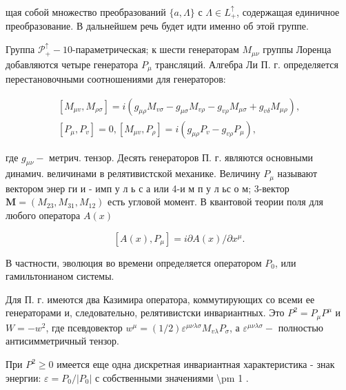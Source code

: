 \documentclass[10pt]{article}
\begin{document}
щая собой множество преобразований $\{a, \Lambda\}$ с $\Lambda \in L_{+}^{\uparrow}$, содержащая единичное преобразование. В дальнейшем речь будет идти именно об этой группе.



Группа $\mathscr{P}_{+}^{\uparrow}-10$-параметрическая; к шести генераторам $M_{\mu \nu}$ группы Лоренца добавляются четыре генератора $P_{\mu}$ трансляций. Алгебра Ли П. г. определяется перестановочными соотношениями для генераторов:



\[

\begin{gathered}

{\left[M_{\mu v}, M_{\rho \sigma}\right]=i\left(g_{\mu \rho} M_{v \sigma}-g_{\mu \sigma} M_{v \rho}-g_{v \rho} M_{\mu \sigma}+g_{v \delta} M_{\mu \rho}\right),} \\

{\left[P_{\mu}, P_{v}\right]=0,\left[M_{\mu v}, P_{\rho}\right]=i\left(g_{\mu \rho} P_{v}-g_{v \rho} P_{\mu}\right),}

\end{gathered}

\]



где $g_{\mu \nu}-$ метрич. тензор. Десять генераторов П. г. являются основными динамич. величинами в релятивистской механике. Величину $P_{\mu}$ называют вектором энер ги и - имп у л ь с а или 4-и м п у л ьс о м; 3-вектор $\boldsymbol{M}=\left(M_{23}, M_{31}, M_{12}\right)$ есть угловой момент. В квантовой теории поля для любого оператора $A(x)$



\[

\left[A(x), P_{\mu}\right]=i \partial A(x) / \partial x^{\mu} .

\]



В частности, эволюция во времени определяется оператором $P_{0}$, или гамильтонианом системы.



Для П. г. имеются два Казимира оператора, коммутирующих со всеми ее генераторами и, следовательно, релятивистски инвариантных. Это $P^{2}=P_{\mu} P^{\mu}$ и $W=-w^{2}$, где псевдовектор $w^{\mu}=(1 / 2) \varepsilon^{\mu \nu \lambda \sigma} M_{v \lambda} P_{\sigma}$, а $\varepsilon^{\mu \nu \lambda \sigma}-$ полностью антисимметричный тензор.



При $P^{2} \geqslant 0$ имеется еще одна дискретная инвариантная характеристика - знак энергии: $\varepsilon=P_{0} /\left|P_{0}\right|$ с собственными значениями \textbackslash pm 1 .
\end{document}
